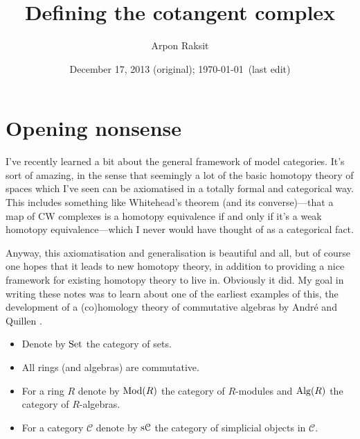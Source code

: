 



\title{Defining the cotangent complex}
\author{Arpon Raksit}
\date{December 17, 2013 (original); \today\ (last edit)}


\maketitle
\thispagestyle{fancy}


\section*{Opening nonsense}

I've recently learned a bit about the general framework of model
categories. It's sort of amazing, in the sense that seemingly a lot of
the basic homotopy theory of spaces which I've seen can be axiomatised
in a totally formal and categorical way. This includes something like
Whitehead's theorem (and its converse)---that a map of CW complexes is
a homotopy equivalence if and only if it's a weak homotopy
equivalence---which I never would have thought of as a categorical
fact.

Anyway, this axiomatisation and generalisation is beautiful and all,
but of course one hopes that it leads to new homotopy theory, in
addition to providing a nice framework for existing homotopy theory to
live in. Obviously it did. My goal in writing these notes was to learn
about one of the earliest examples of this, the development of a
(co)homology theory of commutative algebras by Andr\'{e}
\cite{andre-cotangent} and Quillen \cite{quillen-cotangent}.

\renewcommand{\C}{\mathcal{C}}

\begin{notation-nonum}
  \begin{itemize}[leftmargin=*]
  \item Denote by $\mathrm{Set}$ the category of sets.
  \item All rings (and algebras) are commutative.
  \item For a ring $R$ denote by $\mathrm{Mod}(R)$ the category of $R$-modules
    and $\mathrm{Alg}(R)$ the category of $R$-algebras.
  \item For a category $\C$ denote by $\s\C$ the category of
    simplicial objects in $\C$.
  \end{itemize}
\end{notation-nonum}

